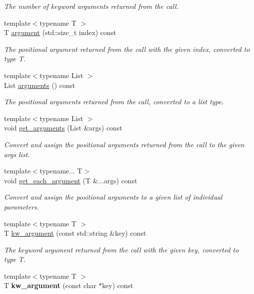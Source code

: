 \begin{DoxyCompactItemize}
\begin{DoxyCompactList}\small\item\em The number of keyword arguments returned from the call. \end{DoxyCompactList}\item 
{\footnotesize template$<$typename T $>$ }\\T \hyperlink{classautobahn_1_1wamp__call__result_acd294dba78dc78a987ce1188e8ba5b18}{argument} (std\+::size\+\_\+t index) const 
\begin{DoxyCompactList}\small\item\em The positional argument returned from the call with the given {\ttfamily index}, converted to type T. \end{DoxyCompactList}\item 
{\footnotesize template$<$typename List $>$ }\\List \hyperlink{classautobahn_1_1wamp__call__result_ae2ea76118fe4ee083b0f482e4b7f6488}{arguments} () const 
\begin{DoxyCompactList}\small\item\em The positional arguments returned from the call, converted to a list type. \end{DoxyCompactList}\item 
{\footnotesize template$<$typename List $>$ }\\void \hyperlink{classautobahn_1_1wamp__call__result_aa14b7c3437631416ceb729fb2b1ffc5b}{get\+\_\+arguments} (List \&args) const 
\begin{DoxyCompactList}\small\item\em Convert and assign the positional arguments returned from the call to the given {\ttfamily args} list. \end{DoxyCompactList}\item 
{\footnotesize template$<$typename... T$>$ }\\void \hyperlink{classautobahn_1_1wamp__call__result_a295604404ea2ed113f65c0ea8343da97}{get\+\_\+each\+\_\+argument} (T \&...args) const 
\begin{DoxyCompactList}\small\item\em Convert and assign the positional arguments to a given list of individual parameters. \end{DoxyCompactList}\item 
{\footnotesize template$<$typename T $>$ }\\T \hyperlink{classautobahn_1_1wamp__call__result_adc18192ecd1f80e8f58059cf4478a2a1}{kw\+\_\+argument} (const std\+::string \&key) const 
\begin{DoxyCompactList}\small\item\em The keyword argument returned from the call with the given {\ttfamily key}, converted to type T. \end{DoxyCompactList}\item 
{\footnotesize template$<$typename T $>$ }\\T {\bfseries kw\+\_\+argument} (const char $\ast$key) const \hypertarget{classautobahn_1_1wamp__call__result_a540ce740fe94e491d4dc37f80980f79d}{}\label{classautobahn_1_1wamp__call__result_a540ce740fe94e491d4dc37f80980f79d}


\end{DoxyCompactItemize}
